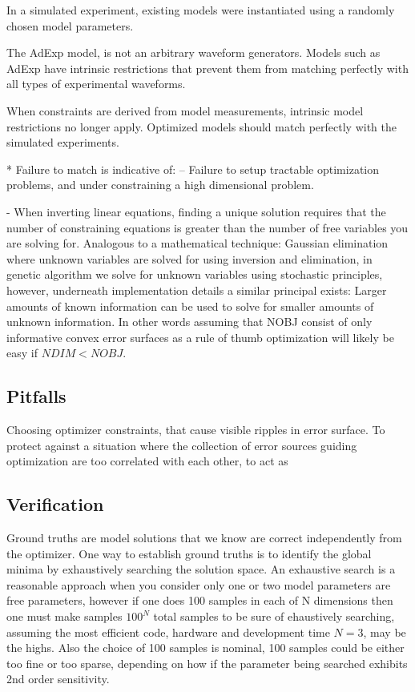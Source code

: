 In a simulated experiment, existing models were instantiated using a randomly chosen model parameters.

The AdExp model, is not an arbitrary waveform generators. Models such as AdExp have intrinsic restrictions that prevent them from matching perfectly with all types of experimental waveforms.



When constraints are derived from model measurements, intrinsic model restrictions no longer apply. Optimized models should match perfectly with the simulated experiments. 

* Failure to match is indicative of: -- Failure to setup tractable optimization problems, and under constraining  a high dimensional problem.

- When inverting linear equations, finding a unique solution requires that the number of constraining equations is greater than the number of free variables you are solving for. Analogous to a mathematical technique: Gaussian elimination where unknown variables are solved for using inversion and elimination, in genetic algorithm we solve for unknown variables using stochastic principles, however, underneath implementation details a similar principal exists: Larger amounts of known information can be used to solve for smaller amounts of unknown information. In other words assuming that NOBJ consist of only informative convex error surfaces as a rule of thumb optimization will likely be easy if $NDIM<NOBJ$.

\subsection{Pitfalls}
Choosing optimizer constraints, that cause visible ripples in error surface.
To protect against a situation where the collection of error sources guiding optimization are too correlated with each other, to act as 


\subsection{Verification}
Ground truths are model solutions that we know are correct independently from the optimizer. One way to establish ground truths is to identify the global minima by exhaustively searching the solution space. An exhaustive search is a reasonable approach when you consider only one or two model parameters are free parameters, however if one does 100 samples in each of N dimensions then one must make samples $100^{N}$ total samples to be sure of ehaustively searching, assuming the most efficient code, hardware and development time $N=3$, may be the highs.  Also the choice of 100 samples is nominal, 100 samples could be either too fine or too sparse, depending on how if the parameter being searched exhibits 2nd order sensitivity.

